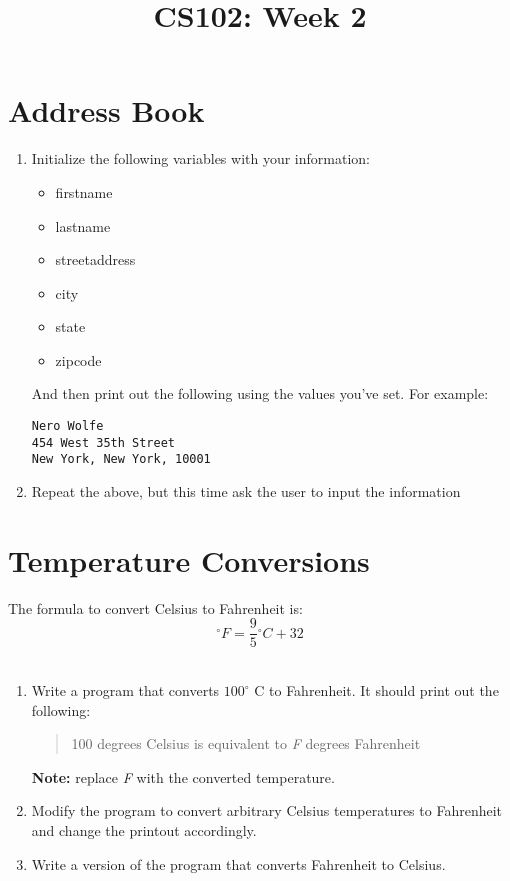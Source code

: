 \documentclass{article}
\begin{document}
\title{CS102: Week 2}

\maketitle
\section{Address Book}
\begin{enumerate}
\item Initialize the following variables with your information:
	\begin{itemize}	
 		\item firstname
		\item lastname
		\item streetaddress
		\item city
		\item state
		\item zipcode
	\end{itemize}
And then print out the following using the values you've set. For example:

\begin{verbatim}
Nero Wolfe
454 West 35th Street
New York, New York, 10001
\end{verbatim}

 \item Repeat the above, but this time ask the user to input the information
\end{enumerate}

\section{Temperature Conversions}
The formula to convert Celsius to Fahrenheit is:
\begin{equation}	
^{\circ} F =  \frac{9}{5} {^{\circ}C} + 32
\end{equation}
\\
\begin{enumerate}
\item Write a program that converts $100^{\circ}$ C to Fahrenheit. It should print out the following:
	\begin{quote}
	100 degrees Celsius is equivalent to \textit{F} degrees Fahrenheit
	\end{quote}
\textbf{Note:} replace \textit{F} with the converted temperature. 
\item Modify the program to convert arbitrary Celsius temperatures to Fahrenheit and change the printout accordingly.
\item Write a version of the program that converts Fahrenheit to Celsius. 
\end{enumerate}
\end{document}
